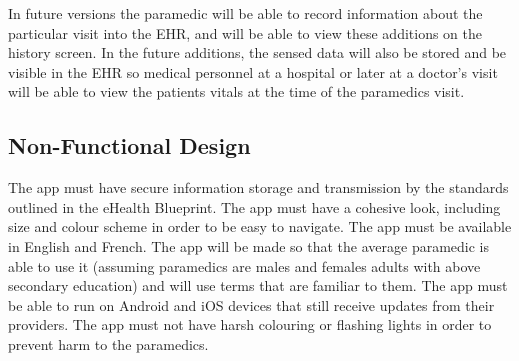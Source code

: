 In future versions the paramedic will be able to record information about the particular visit into the EHR, and will be able to view these additions on the history screen. In the future additions, the sensed data will also be stored and be visible in the EHR so medical personnel at a hospital or later at a doctor's visit will be able to view the patients vitals at the time of the paramedics visit.



\fi







\subsection{Non-Functional Design}
The app must have secure information storage and transmission by the standards outlined in the eHealth Blueprint. The app must have a cohesive look, including size and colour scheme in order to be easy to navigate. The app must be available in English and French. The app will be made so that the average paramedic is able to use it (assuming paramedics are males and females adults with above secondary education) and will use terms that are familiar to them.
The app must be able to run on Android and iOS devices that still receive updates from their providers. The app must not have harsh colouring or flashing lights in order to prevent harm to the paramedics.
